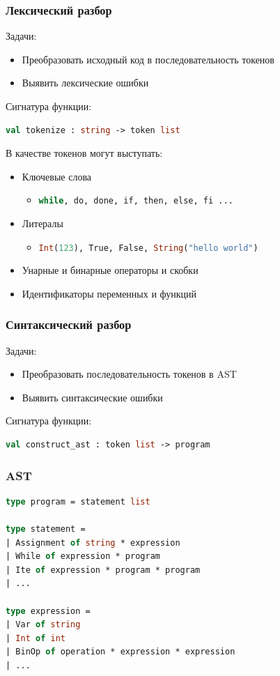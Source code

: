 \documentclass{beamer}
\begin{document}
	\begin{frame}[fragile]
		\frametitle{Лексический разбор}
			Задачи:
			\begin{itemize}
				\item Преобразовать исходный код в последовательность токенов
				\item Выявить лексические ошибки
			\end{itemize}
			Сигнатура функции:
			\begin{lstlisting}[language=ML] 
	val tokenize : string -> token list
			\end{lstlisting}
			В качестве токенов могут выступать:
			\begin{itemize}
				\item Ключевые слова
				\begin{itemize}
					\item \lstinline[language=BASH]|while, do, done, if, then, else, fi ...|
				\end{itemize}
				\item Литералы
				\begin{itemize}
					\item \lstinline[language=ML]|Int(123), True, False, String("hello world")|
				\end{itemize}
				\item Унарные и бинарные операторы и скобки
				\item Идентификаторы переменных и функций
			\end{itemize}
	\end{frame}

	\begin{frame}[fragile]
		\frametitle{Синтаксический разбор}
		Задачи:
		\begin{itemize}
			\item Преобразовать последовательность токенов в AST
			\item Выявить синтаксические ошибки
		\end{itemize}
		Сигнатура функции:	
		\begin{lstlisting}[language=ML] 
	val construct_ast : token list -> program
		\end{lstlisting}
		\end{frame}

	\begin{frame}[fragile]
		\frametitle{AST}
		\begin{lstlisting}[language=ML] 
type program = statement list

type statement =
| Assignment of string * expression
| While of expression * program
| Ite of expression * program * program
| ...

type expression =
| Var of string
| Int of int
| BinOp of operation * expression * expression
| ...
		\end{lstlisting}
	\end{frame}
	
\end{document}

